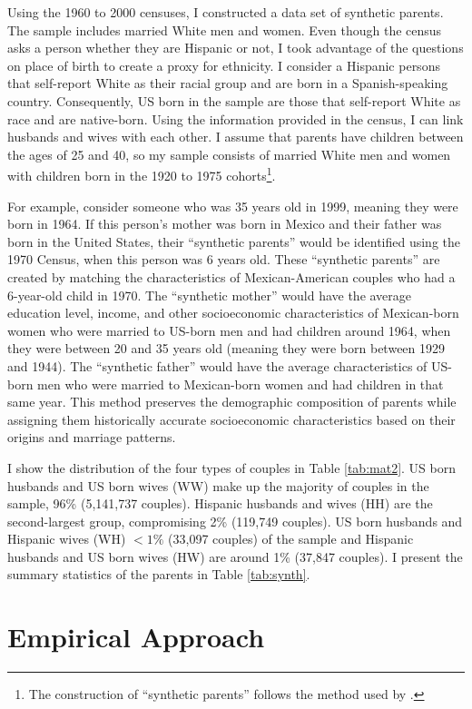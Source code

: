 Using the 1960 to 2000 censuses, I constructed a data set of synthetic parents. The sample includes married White men and women. Even though the census asks a person whether they are Hispanic or not, I took advantage of the questions on place of birth to create a proxy for ethnicity. I consider a Hispanic persons that self-report White as their racial group and are born in a Spanish-speaking country. Consequently, US born in the sample are those that self-report White as race and are native-born. Using the information provided in the census, I can link husbands and wives with each other. I assume that parents have children between the ages of 25 and 40, so my sample consists of married White men and women with children born in the 1920 to 1975 cohorts\footnote{The construction of ``synthetic parents'' follows the method used by \textcite{rubinstein2014pride}.}.

For example, consider someone who was 35 years old in 1999, meaning they were born in 1964. If this person's mother was born in Mexico and their father was born in the United States, their ``synthetic parents'' would be identified using the 1970 Census, when this person was 6 years old. These ``synthetic parents'' are created by matching the characteristics of Mexican-American couples who had a 6-year-old child in 1970. The ``synthetic mother'' would have the average education level, income, and other socioeconomic characteristics of Mexican-born women who were married to US-born men and had children around 1964, when they were between 20 and 35 years old (meaning they were born between 1929 and 1944). The ``synthetic father'' would have the average characteristics of US-born men who were married to Mexican-born women and had children in that same year. This method preserves the demographic composition of parents while assigning them historically accurate socioeconomic characteristics based on their origins and marriage patterns.

I show the distribution of the four types of couples in Table \ref{tab:mat2}. US born husbands and US born wives (WW) make up the majority of couples in the sample, 96\% (5,141,737 couples). Hispanic husbands and wives (HH) are the second-largest group, compromising 2\% (119,749 couples). US born husbands and Hispanic wives (WH) $< 1\%$ (33,097 couples) of the sample and Hispanic husbands and US born wives (HW) are around 1\% (37,847 couples). I present the summary statistics of the parents in Table \ref{tab:synth}.

\section{Empirical Approach}\label{sec:emp_model}


